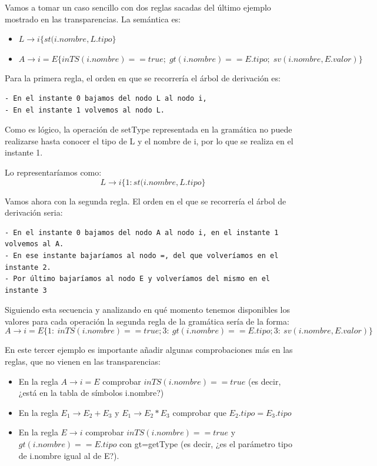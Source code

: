 \documentclass{apuntes}
\begin{document}
\begin{example}
Vamos a tomar un caso sencillo con dos reglas sacadas del último ejemplo mostrado en las transparencias. La semántica es:
\begin{itemize}
\item $L \rightarrow i \{st(i.nombre,L.tipo\}$
\item $A \rightarrow i = E \{in TS (i.nombre)==true; \; gt(i.nombre)==E.tipo; \; sv(i.nombre, E.valor)\} $
\end{itemize}

Para la primera regla, el orden en que se recorrería el árbol de derivación es:
\begin{verbatim}
- En el instante 0 bajamos del nodo L al nodo i,
- En el instante 1 volvemos al nodo L.
\end{verbatim}

Como es lógico, la operación de setType representada en la gramática no puede realizarse hasta conocer el tipo de L y el nombre de i, por lo que se realiza en el instante 1.

Lo representaríamos como:
\[L \rightarrow i \{1:st(i.nombre,L.tipo\}\]

Vamos ahora con la segunda regla. El orden en el que se recorrería el árbol de derivación seria:
\begin{verbatim}
- En el instante 0 bajamos del nodo A al nodo i, en el instante 1 volvemos al A.
- En ese instante bajaríamos al nodo =, del que volveríamos en el instante 2.
- Por último bajaríamos al nodo E y volveríamos del mismo en el instante 3
\end{verbatim}

Siguiendo esta secuencia y analizando en qué momento tenemos disponibles los valores para cada operación la segunda regla de la gramática sería de la forma:
\[A \rightarrow i = E \{ 1: \ in TS (i.nombre)==true; 3: \ gt(i.nombre)==E.tipo; 3: \ sv(i.nombre, E.valor)\}\]

En este tercer ejemplo es importante añadir algunas comprobaciones más en las reglas, que no vienen en las transparencias:
\begin{itemize}
\item En la regla $A \rightarrow i=E$ comprobar $inTS(i.nombre)==true$ (es decir, ¿está en la tabla de símbolos i.nombre?)

\item En la regla $E_1 \rightarrow E_2 + E_3$ y $E_1 \rightarrow E_2 * E_3$ comprobar que $E_2.tipo=E_3.tipo$

\item En la regla $E \rightarrow i$ comprobar $inTS(i.nombre)==true$ y $gt(i.nombre)==E.tipo$ con gt=getType (es decir, ¿es el parámetro tipo de i.nombre igual al de E?).
\end{itemize}
\end{example}
\end{document}
